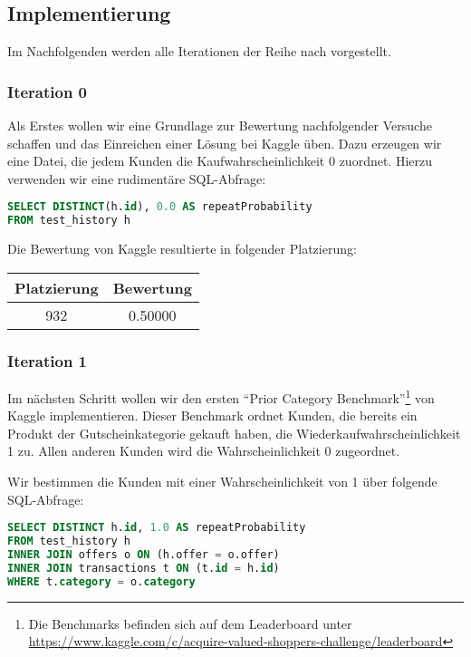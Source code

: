 \subsection{Implementierung}
Im Nachfolgenden werden alle Iterationen der Reihe nach vorgestellt.

\subsubsection{Iteration 0}
\label{sec:iteration0}

Als Erstes wollen wir eine Grundlage zur Bewertung nachfolgender Versuche schaffen und das Einreichen einer
Lösung bei Kaggle üben. Dazu erzeugen wir eine Datei, die jedem Kunden die Kaufwahrscheinlichkeit 0
zuordnet. Hierzu verwenden wir eine rudimentäre SQL-Abfrage:

\begin{lstlisting}[language=SQL]
SELECT DISTINCT(h.id), 0.0 AS repeatProbability 
FROM test_history h
\end{lstlisting}

Die Bewertung von Kaggle resultierte in folgender Platzierung:

\begin{tabular}{|c|c|}
	\hline \textbf{Platzierung} & \textbf{Bewertung} \\ 
	\hline 932 & 0.50000  \\ 
	\hline 
\end{tabular}

\subsubsection{Iteration 1}

Im nächsten Schritt wollen wir den ersten "`Prior Category Benchmark"'\footnote{Die Benchmarks befinden sich auf dem Leaderboard unter \\
\url{https://www.kaggle.com/c/acquire-valued-shoppers-challenge/leaderboard}} von Kaggle implementieren.
Dieser Benchmark ordnet Kunden, die bereits ein Produkt der Gutscheinkategorie gekauft haben, 
die Wiederkaufwahrscheinlichkeit 1 zu. Allen anderen Kunden wird die Wahrscheinlichkeit 0 zugeordnet.

Wir bestimmen die Kunden mit einer Wahrscheinlichkeit von 1 über folgende SQL-Abfrage:
\begin{lstlisting}[language=SQL]
SELECT DISTINCT h.id, 1.0 AS repeatProbability
FROM test_history h 
INNER JOIN offers o ON (h.offer = o.offer)
INNER JOIN transactions t ON (t.id = h.id)
WHERE t.category = o.category
\end{lstlisting}

